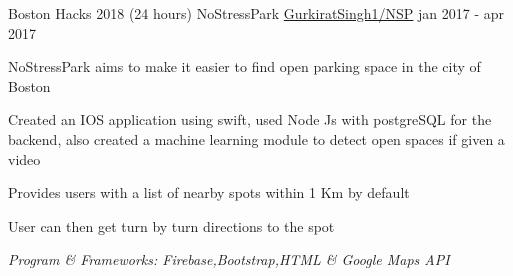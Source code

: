 \vspace*{-3mm}
\begin{cventries}
  \cventry
    {Boston Hacks 2018 (24 hours)}
    {NoStressPark}
    {\href{https://github.com/GurkiratSingh1/NSP}{\faGithub \hspace{1mm}GurkiratSingh1/NSP}}
    {jan 2017 - apr 2017}
    {
      \begin{cvitems}
        \item {NoStressPark aims to make it easier to find open parking space in the city of Boston}
        \item {Created an IOS application using swift, used Node Js with postgreSQL for the backend, also created a machine learning module to detect open spaces if given a video}
        \item {Provides users with a list of nearby spots within 1 Km by default}
        \item{User can then get turn by turn directions to the spot\\}
      \end{cvitems}
      \vspace*{-3mm}
      \newline
      \hfill \textit{Program \& Frameworks: Firebase,Bootstrap,HTML \& Google Maps API}}
   \end{cventries}
   \vspace*{-3mm}
